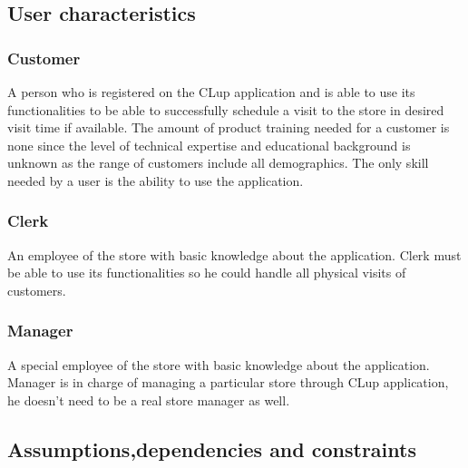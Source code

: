 \subsection{User characteristics}


\subsubsection {Customer}
A person who is registered on the CLup application and is able to use its functionalities to be able to successfully schedule a visit to the store in desired visit time if available. The amount of product training needed for a customer is none since the level of technical expertise and educational background is unknown as the range of customers include all demographics. The only skill needed by a user is the ability to use the application.

\subsubsection {Clerk}
An employee of the store with basic knowledge about the application. Clerk must be able to use its functionalities so he could handle all physical visits of customers.

\subsubsection {Manager}
A special employee of the store with basic knowledge about the application. Manager is in charge of managing a particular store through CLup application, he doesn't need to be a real store manager as well.

\subsection{Assumptions,dependencies and constraints}


